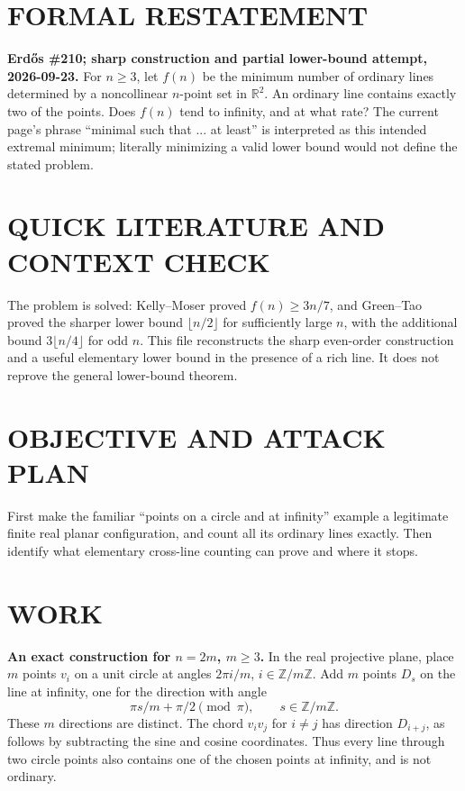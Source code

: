 \section{FORMAL RESTATEMENT}
\textbf{Erd\H{o}s \#210; sharp construction and partial lower-bound attempt, 2026-09-23.}
For $n\geq3$, let $f(n)$ be the minimum number of ordinary lines determined by a noncollinear $n$-point set in $\mathbb R^2$. An ordinary line contains exactly two of the points. Does $f(n)$ tend to infinity, and at what rate? The current page's phrase ``minimal such that ... at least'' is interpreted as this intended extremal minimum; literally minimizing a valid lower bound would not define the stated problem.

\section{QUICK LITERATURE AND CONTEXT CHECK}
The problem is solved: Kelly--Moser proved $f(n)\geq3n/7$, and Green--Tao proved the sharper lower bound $\lfloor n/2\rfloor$ for sufficiently large $n$, with the additional bound $3\lfloor n/4\rfloor$ for odd $n$. This file reconstructs the sharp even-order construction and a useful elementary lower bound in the presence of a rich line. It does not reprove the general lower-bound theorem.

\section{OBJECTIVE AND ATTACK PLAN}
First make the familiar ``points on a circle and at infinity'' example a legitimate finite real planar configuration, and count all its ordinary lines exactly. Then identify what elementary cross-line counting can prove and where it stops.

\section{WORK}
\textbf{An exact construction for $n=2m$, $m\geq3$.} In the real projective plane, place $m$ points $v_i$ on a unit circle at angles $2\pi i/m$, $i\in\mathbb Z/m\mathbb Z$. Add $m$ points $D_s$ on the line at infinity, one for the direction with angle
\[
\pi s/m+\pi/2\pmod\pi,
\qquad s\in\mathbb Z/m\mathbb Z.
\]
These $m$ directions are distinct. The chord $v_iv_j$ for $i\ne j$ has direction $D_{i+j}$, as follows by subtracting the sine and cosine coordinates. Thus every line through two circle points also contains one of the chosen points at infinity, and is not ordinary.

